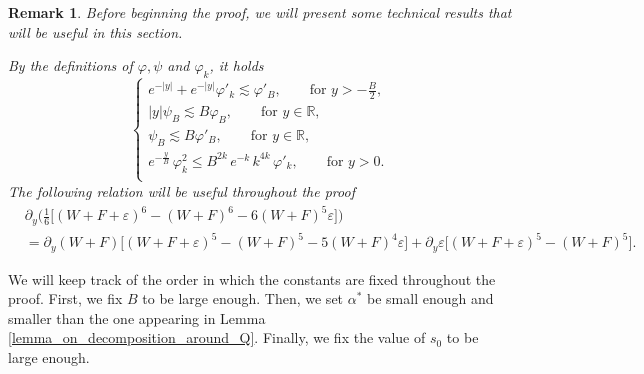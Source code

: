 \documentclass[16pt,english, oneside,reqno]{smfart}
\newcommand{\RR}{\mathbb{R}}
\newcommand{\vare}{{\varepsilon}}
\newcommand{\vphi}{{\varphi}}
\newtheorem{remark}{Remark}[section]
\begin{document}
\begin{remark}
Before beginning the proof, we will present some technical results that will be useful in this section.

By the definitions of $\vphi,\psi$ and $\vphi_k$, it holds
\begin{equation}\label{estimates_between_psiB_and_phi_B}
\begin{cases}
    e^{-|y|} + e^{-|y|}\vphi'_k \lesssim \vphi'_B, \qquad \text{for } y>-\frac{B}{2},\\
    |y|\psi_B \lesssim B \vphi_B, \qquad \text{for } y \in \RR,\\
    \psi_B \lesssim B \vphi'_B, \qquad \text{for } y \in \RR,\\
    e^{-\frac{y}{B}}\,\vphi^2_k \leq B^{2k}\,e^{-k}\,k^{4k}\,\vphi'_k, \qquad \text{for } y >0.\\
\end{cases}
\end{equation}
The following relation will be useful throughout the proof
\begin{equation}\label{relation_on_partial_eps_and_order_5}
\begin{split}
    & \partial_y \Bigg( \frac{1}{6} \Big[(W+F+\vare)^6 - (W+F)^6 - 6 (W+F)^5 \vare \Big] \Bigg) \\
    & = \partial_y (W+F) \Big[ (W+F+\vare)^5 - (W+F)^5 - 5 (W+F)^4 \vare\Big] + \partial_y \vare \Big[ (W+F+\vare)^5 - (W+F)^5 \Big].
\end{split}
\end{equation}
\end{remark}


We will keep track of the order in which the constants are fixed throughout the proof. First, we fix $B$ to be large enough. Then, we set $\alpha^*$ be small enough and smaller than the one appearing in Lemma \ref{lemma_on_decomposition_around_Q}. Finally, we fix the value of $s_0$ to be large enough.
\end{document}

